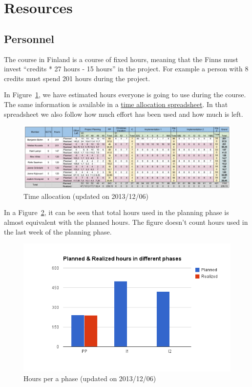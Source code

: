 \section{Resources}
\subsection{Personnel}

The course in Finland is a course of fixed hours, meaning that the
Finns must invest ``credits * 27 hours - 15 hours'' in the project. For example
a person with 8 credits must spend 201 hours during the project.

In Figure~\ref{fig:timeallocation}, we have estimated hours everyone is going to
use during the course. The same information is available in a
\href{https://docs.google.com/spreadsheet/ccc?key=0Ahu59q_GwtcedHI3MnJQM0NWZS11a
GxFTzFZeVEyQVE&usp=sharing}{time allocation spreadsheet}. In that spreadsheet we
also follow how much effort has been used and how much is left.

\begin{figure}[H]
\centering
\includegraphics[width=1\textwidth]{imgs/timeallocation.png}
\caption{Time allocation (updated on 2013/12/06)}
\label{fig:timeallocation}
\end{figure}

In a Figure~\ref{fig:hours_phases}, it can be seen that total hours used in the
planning phase is almost equivalent with the planned hours. The figure doesn't
count hours used in the last week of the planning phase.

\begin{figure}[H]
\centering
\includegraphics[width=1\textwidth]{imgs/chart_1.png}
\caption{Hours per a phase (updated on 2013/12/06)}
\label{fig:hours_phases}
\end{figure}

